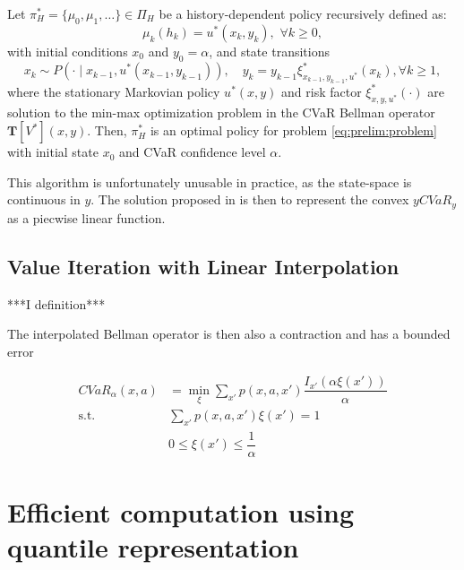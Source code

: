 \begin{theorem}\label{thm:vi:optimalpolicy}
Let $\pi_H^*=\{\mu_0,\mu_1,\ldots\}\in\Pi_H$ be a history-dependent policy recursively defined as:
\begin{equation}\label{eq:policy_construct}
\mu_k(h_k) = u^*(x_k, y_k),\,\,\forall k\geq 0,
\end{equation}
with initial conditions $x_0$ and $y_0=\alpha$, and state transitions
\begin{equation}\label{eq:opt_state}
x_k\sim P(\cdot\mid x_{k-1},u^*(x_{k-1},y_{k-1})),\quad y_k = y_{k-1}\xi_{x_{k-1},y_{k-1},u^*}^*(x_k), \forall k\geq 1,
\end{equation}
where the stationary Markovian policy $u^*(x,y)$ and risk factor $\xi_{x,y,u^*}^*(\cdot)$ are solution to the  min-max optimization problem in the CVaR Bellman operator $\mathbf T[V^*](x,y)$.
Then, $\pi^*_H$ is an optimal policy for problem \eqref{eq:prelim:problem} with initial state $x_0$ and CVaR confidence level $\alpha$.
\end{theorem}


This algorithm is unfortunately unusable in practice, as the state-space is continuous in $y$. The solution proposed in \cite{chow2015risk} is then to represent the convex $y CVaR_y$ as a piecwise linear function. 

\subsection{Value Iteration with Linear Interpolation}

***I definition***

The interpolated Bellman operator is then also a contraction and has a bounded error

\begin{equation}
\begin{split}
CVaR_\alpha(x, a)&=\min_{\xi} \sum_{x'} p(x, a, x')\dfrac{I_{x'}(\alpha \xi(x'))}{\alpha}\\
\text{s.t.}\quad &\sum_{x'}p(x, a, x')\xi(x')=1\\
&0 \le \xi(x')\le \dfrac{1}{\alpha}
\end{split}
\end{equation}



\section{Efficient computation using quantile representation}\label{sec:vi:linear}
